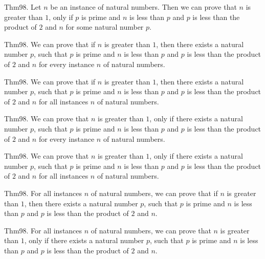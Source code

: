\documentclass{article}
\begin{document}
Thm98. Let $n$ be an instance of natural numbers. Then we can prove that $n$ is greater than $1$, only if $p$ is prime and $n$ is less than $p$ and $p$ is less than the product of $2$ and $n$ for some natural number $p$.

Thm98. We can prove that if $n$ is greater than $1$, then there exists a natural number $p$, such that $p$ is prime and $n$ is less than $p$ and $p$ is less than the product of $2$ and $n$ for every instance $n$ of natural numbers.

Thm98. We can prove that if $n$ is greater than $1$, then there exists a natural number $p$, such that $p$ is prime and $n$ is less than $p$ and $p$ is less than the product of $2$ and $n$ for all instances $n$ of natural numbers.

Thm98. We can prove that $n$ is greater than $1$, only if there exists a natural number $p$, such that $p$ is prime and $n$ is less than $p$ and $p$ is less than the product of $2$ and $n$ for every instance $n$ of natural numbers.

Thm98. We can prove that $n$ is greater than $1$, only if there exists a natural number $p$, such that $p$ is prime and $n$ is less than $p$ and $p$ is less than the product of $2$ and $n$ for all instances $n$ of natural numbers.

Thm98. For all instances $n$ of natural numbers, we can prove that if $n$ is greater than $1$, then there exists a natural number $p$, such that $p$ is prime and $n$ is less than $p$ and $p$ is less than the product of $2$ and $n$.

Thm98. For all instances $n$ of natural numbers, we can prove that $n$ is greater than $1$, only if there exists a natural number $p$, such that $p$ is prime and $n$ is less than $p$ and $p$ is less than the product of $2$ and $n$.
\end{document}
